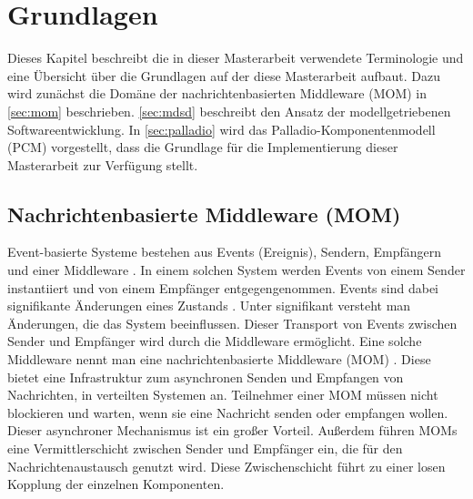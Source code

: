 
\chapter{Grundlagen}
\label{ch:Grundlagen}
Dieses Kapitel beschreibt die in dieser Masterarbeit verwendete Terminologie und eine Übersicht über die Grundlagen auf der diese Masterarbeit aufbaut. Dazu wird zunächst die Domäne der nachrichtenbasierten Middleware (MOM) in \autoref{sec:mom} beschrieben. \autoref{sec:mdsd} beschreibt den Ansatz der modellgetriebenen Softwareentwicklung. In \autoref{sec:palladio} wird das Palladio-Komponentenmodell (PCM) vorgestellt, dass die Grundlage für die Implementierung dieser Masterarbeit zur Verfügung stellt.

\section{Nachrichtenbasierte Middleware (MOM)}
\label{sec:mom}
Event-basierte Systeme bestehen aus Events (Ereignis), Sendern, Empfängern und einer Middleware \cite{Carzaniga1998}. In einem solchen System werden Events von einem Sender instantiiert und von einem Empfänger entgegengenommen. Events sind dabei signifikante Änderungen eines Zustands \cite{Chandy2006}. Unter signifikant versteht man Änderungen, die das System beeinflussen. Dieser Transport von Events zwischen Sender und Empfänger wird durch die Middleware ermöglicht. Eine solche Middleware nennt man eine nachrichtenbasierte Middleware (MOM) \cite{Curry05}. Diese bietet eine Infrastruktur zum asynchronen Senden und Empfangen von Nachrichten, in verteilten Systemen an. Teilnehmer einer MOM müssen nicht blockieren und warten, wenn sie eine Nachricht senden oder empfangen wollen. Dieser asynchroner Mechanismus ist ein großer Vorteil. Außerdem führen MOMs eine Vermittlerschicht zwischen Sender und Empfänger ein, die für den Nachrichtenaustausch genutzt wird. Diese Zwischenschicht führt zu einer losen Kopplung der einzelnen Komponenten.  \\

